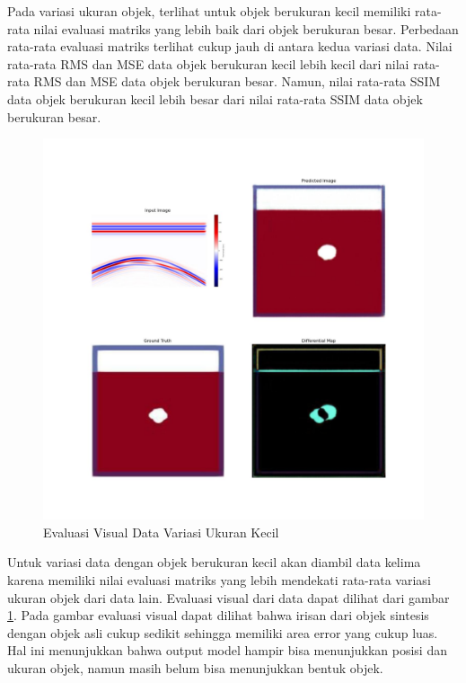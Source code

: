 Pada variasi ukuran objek, terlihat untuk objek berukuran kecil memiliki rata-rata nilai evaluasi matriks yang lebih baik dari objek berukuran besar. 
Perbedaan rata-rata evaluasi matriks terlihat cukup jauh di antara kedua variasi data. 
Nilai rata-rata RMS dan MSE data objek berukuran kecil lebih kecil dari nilai rata-rata RMS dan MSE data objek berukuran besar. 
Namun, nilai rata-rata SSIM data objek berukuran kecil lebih besar dari nilai rata-rata SSIM data objek berukuran besar. 

\begin{figure}[ht]
  \centering
  \includegraphics[scale=0.15]{gambar/diffMapKecil.jpg}
  \caption{Evaluasi Visual Data Variasi Ukuran Kecil}
  \label{fig:diffmapkecil}
\end{figure}

Untuk variasi data dengan objek berukuran kecil akan diambil data kelima karena memiliki nilai evaluasi matriks yang lebih mendekati rata-rata variasi ukuran objek dari data lain. 
Evaluasi visual dari data dapat dilihat dari gambar \ref{fig:diffmapkecil}. 
Pada gambar evaluasi visual dapat dilihat bahwa irisan dari objek sintesis dengan objek asli cukup sedikit sehingga memiliki area error yang cukup luas. 
Hal ini menunjukkan bahwa output model hampir bisa menunjukkan posisi dan ukuran objek, namun masih belum bisa menunjukkan bentuk objek.

